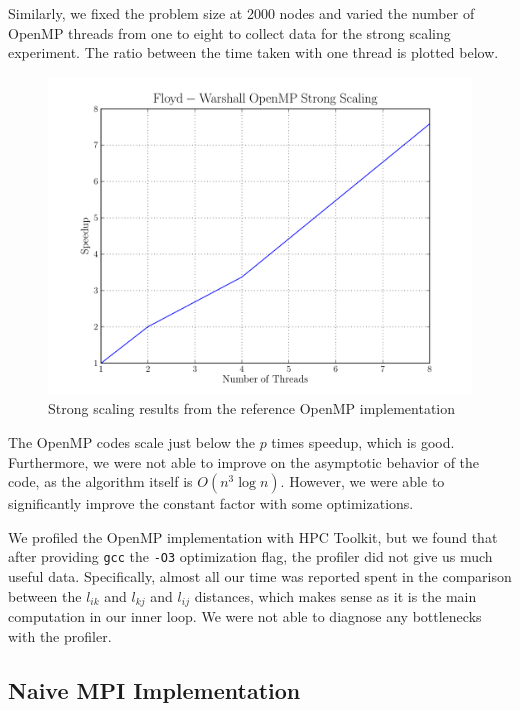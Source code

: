 \documentclass[12pt]{article}
\begin{document}
Similarly, we fixed the problem size at 2000 nodes and varied the
number of OpenMP threads from one to eight to collect data for the
strong scaling experiment. The ratio between the time taken with one
thread is plotted below.

\begin{figure}[h!]
  \centering
  \includegraphics[scale=0.7]{../profiling/omp_strong.pdf}
  \caption{Strong scaling results from the reference OpenMP implementation}
\end{figure}

\noindent The OpenMP codes scale just below the $p$ times speedup, which
is good. Furthermore, we were not able to improve on the asymptotic
behavior of the code, as the algorithm itself is $O(n^3 \log n)$. However,
we were able to significantly improve the constant factor with some
optimizations.

\vspace{0.75em}
\noindent We profiled the OpenMP implementation with HPC Toolkit,
but we found that after providing {\tt gcc} the {\tt -O3} optimization
flag, the profiler did not give us much useful data. Specifically, almost
all our time was reported spent in the comparison between the $l_{ik}$ and
$l_{kj}$ and $l_{ij}$ distances, which makes sense as it is the main
computation in our inner loop. We were not able to diagnose any bottlenecks
with the profiler.
\noindent

\subsection*{Naive MPI Implementation}
\end{document}
